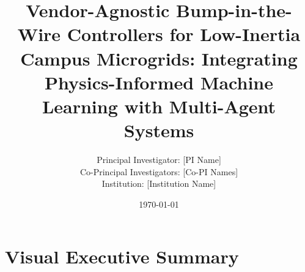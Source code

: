 \documentclass[12pt]{article}
\begin{document}
\title{\Large\textbf{Vendor-Agnostic Bump-in-the-Wire Controllers for Low-Inertia Campus Microgrids: Integrating Physics-Informed Machine Learning with Multi-Agent Systems}}


\author{Principal Investigator: [PI Name]\\
Co-Principal Investigators: [Co-PI Names]\\
Institution: [Institution Name]}

\date{\today}

\maketitle

\section{Visual Executive Summary}
\end{document}
